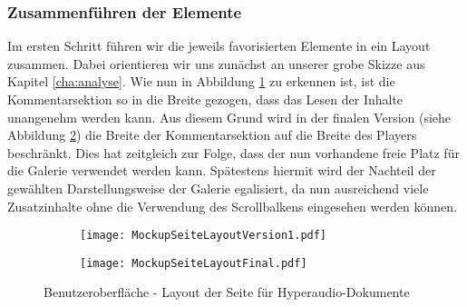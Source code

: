 

\subsubsection{Zusammenführen der Elemente}
Im ersten Schritt führen wir die jeweils favorisierten Elemente in ein Layout zusammen. Dabei orientieren wir uns zunächst an unserer grobe Skizze aus Kapitel \ref{cha:analyse}. Wie nun in Abbildung \ref{fig:MockupSeiteLayoutVersion1} zu erkennen ist, ist die Kommentarsektion so in die Breite gezogen, dass das Lesen der Inhalte unangenehm werden kann. Aus diesem Grund wird in der finalen Version (siehe Abbildung \ref{fig:MockupSeiteLayoutFinal}) die Breite der Kommentarsektion auf die Breite des Players beschränkt. Dies hat zeitgleich zur Folge, dass der nun vorhandene freie Platz für die Galerie verwendet werden kann. Spätestens hiermit wird der Nachteil der gewählten Darstellungsweise der Galerie egalisiert, da nun ausreichend viele Zusatzinhalte ohne die Verwendung des Scrollbalkens eingesehen werden können.



\begin{figure}[h!]
\begin{subfigure}[c]{\textwidth}
\texttt{[image: MockupSeiteLayoutVersion1.pdf]}
\label{fig:MockupSeiteLayoutVersion1}
\end{subfigure}
\par\bigskip
\begin{subfigure}[c]{\textwidth}
\texttt{[image: MockupSeiteLayoutFinal.pdf]}
\label{fig:MockupSeiteLayoutFinal}
\end{subfigure}
\caption{Benutzeroberfläche - Layout der Seite für Hyperaudio-Dokumente}
\label{fig:MockupSeiteLayout}
\end{figure}

